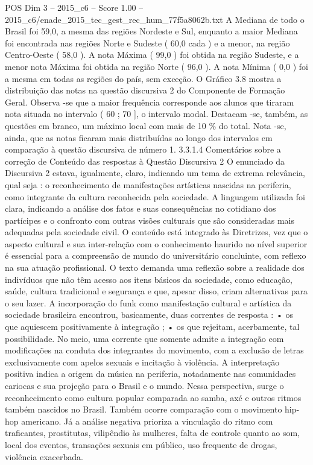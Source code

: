 \begin{textsample}{POS Dim 3 – 2015\_c6 – Score 1.00 – 2015\_c6/enade\_2015\_tec\_gest\_rec\_hum\_77f5a8062b.txt}
A Mediana de todo o Brasil foi 59,0, a mesma das regiões Nordeste e Sul, enquanto a maior Mediana foi encontrada nas regiões Norte e Sudeste ( 60,0 cada ) e a menor, na região Centro-Oeste ( 58,0 ).
A nota Máxima ( 99,0 ) foi obtida na região Sudeste, e a menor nota Máxima foi obtida na região Norte ( 96,0 ).
A nota Mínima ( 0,0 ) foi a mesma em todas as regiões do país, sem exceção.
O Gráfico 3.8 mostra a distribuição das notas na questão discursiva 2 do Componente de Formação Geral.
Observa -se que a maior frequência corresponde aos alunos que tiraram nota situada no intervalo ( 60 ; 70 ], o intervalo modal.
Destacam -se, também, as questões em branco, um máximo local com mais de 10 \% do total.
Nota -se, ainda, que as notas ficaram mais distribuídas ao longo dos intervalos em comparação à questão discursiva de número 1. 3.3.1.4 Comentários sobre a correção de Conteúdo das respostas à Questão Discursiva 2 O enunciado da Discursiva 2 estava, igualmente, claro, indicando um tema de extrema relevância, qual seja : o reconhecimento de manifestações artísticas nascidas na periferia, como integrante da cultura reconhecida pela sociedade.
A linguagem utilizada foi clara, indicando a análise dos fatos e suas consequências no cotidiano dos partícipes e o confronto com outras visões culturais que são consideradas mais adequadas pela sociedade civil.
O conteúdo está integrado às Diretrizes, vez que o aspecto cultural e sua inter-relação com o conhecimento haurido no nível superior é essencial para a compreensão de mundo do universitário concluinte, com reflexo na sua atuação profissional.
O texto demanda uma reflexão sobre a realidade dos indivíduos que não têm acesso aos itens básicos da sociedade, como educação, saúde, cultura tradicional e segurança e que, apesar disso, criam alternativas para o seu lazer.
A incorporação do funk como manifestação cultural e artística da sociedade brasileira encontrou, basicamente, duas correntes de resposta : • os que aquiescem positivamente à integração ; • os que rejeitam, acerbamente, tal possibilidade.
No meio, uma corrente que somente admite a integração com modificações na conduta dos integrantes do movimento, com a exclusão de letras exclusivamente com apelos sexuais e incitação à violência.
A interpretação positiva indica a origem da música na periferia, notadamente nas comunidades cariocas e sua projeção para o Brasil e o mundo.
Nessa perspectiva, surge o reconhecimento como cultura popular comparada ao samba, axé e outros ritmos também nascidos no Brasil.
Também ocorre comparação com o movimento hip-hop americano.
Já a análise negativa prioriza a vinculação do ritmo com traficantes, prostitutas, vilipêndio às mulheres, falta de controle quanto ao som, local dos eventos, transações sexuais em público, uso frequente de drogas, violência exacerbada.

\end{textsample}

